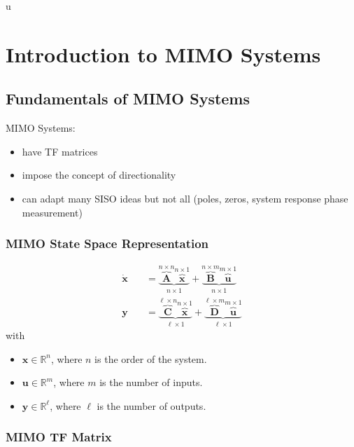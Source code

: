 u\section{Introduction to MIMO Systems}
\subsection{Fundamentals of MIMO Systems}


MIMO Systems:
\begin{itemize}
    \item have TF matrices
    \item impose the concept of directionality
    \item can adapt many SISO ideas but not all (poles, zeros, system response phase measurement)
\end{itemize}

\subsubsection{MIMO State Space Representation}
\noindent\begin{align*}
    \dot{\mathbf{x}} & =\underbrace{\overbrace{\mathbf{A}}^{n\times n}\overbrace{\mathbf{x}}^{n\times1}}_{n\times1}+\underbrace{\overbrace{\mathbf{B}}^{n\times m}\overbrace{\mathbf{u}}^{m\times1}}_{n\times1}             \\
    \mathbf{y}\quad  & =\underbrace{\overbrace{\mathbf{C}}^{\ell\times n}\overbrace{\mathbf{x}}^{n\times1}}_{\ell\times1}+\underbrace{\overbrace{\mathbf{D}}^{\ell\times m}\overbrace{\mathbf{u}}^{m\times1}}_{\ell\times1}
\end{align*}
with
\begin{itemize}
    \item $\mathbf{x}\in\mathbb{R}^n$, where $n$ is the order of the system.
    \item $\mathbf{u}\in\mathbb{R}^m$, where $m$ is the number of inputs.
    \item $\mathbf{y}\in\mathbb{R}^\ell$, where $\ell$ is the number of outputs.
\end{itemize}

\subsubsection{MIMO TF Matrix}


